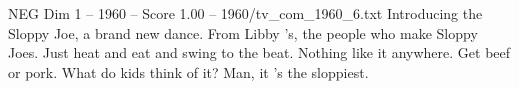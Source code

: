 \begin{textsample}{NEG Dim 1 – 1960 – Score 1.00 – 1960/tv\_com\_1960\_6.txt}  \label{ex:f1_neg_075}
Introducing the Sloppy Joe, a brand new dance.
From Libby 's, the people who make Sloppy Joes.
Just heat and eat and swing to the beat.
Nothing like it anywhere.
Get beef or pork.
What do kids think of it?
Man, it 's the sloppiest.

\end{textsample}
